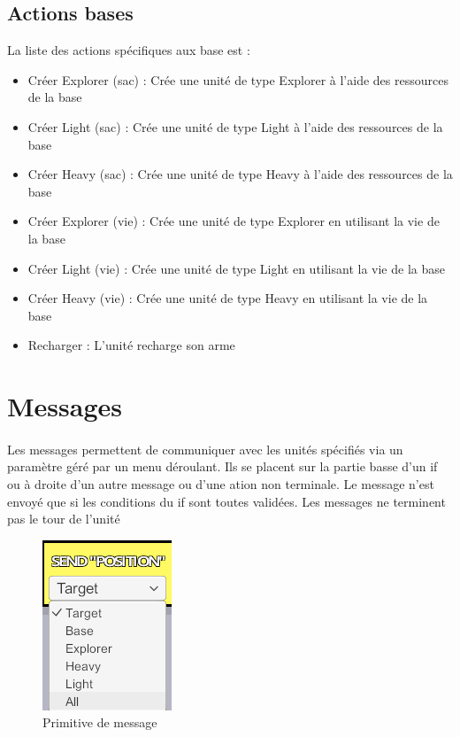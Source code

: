 \documentclass{report}
\begin{document}
\subsection{Actions bases}
La liste des actions spécifiques aux base est :
\begin{itemize}
\item Créer Explorer (sac) : Crée une unité de type Explorer à l'aide des ressources de la base
\item Créer Light (sac) : Crée une unité de type Light à l'aide des ressources de la base
\item Créer Heavy (sac) : Crée une unité de type Heavy à l'aide des ressources de la base
\item Créer Explorer (vie) : Crée une unité de type Explorer en utilisant la vie de la base
\item Créer Light (vie) : Crée une unité de type Light en utilisant la vie de la base
\item Créer Heavy (vie) : Crée une unité de type Heavy en utilisant la vie de la base
\item Recharger : L'unité recharge son arme
\end{itemize}
\newpage
\section{Messages}
\paragraph{}
Les messages permettent de communiquer avec les unités spécifiés via un paramètre géré par un menu déroulant. Ils se placent sur la partie basse d'un if ou à droite d'un autre message ou d'une ation non terminale. Le message n'est envoyé que si les conditions du if sont toutes validées. Les messages ne terminent pas le tour de l'unité\newline
\begin{figure}[!h]
	\centering
		\includegraphics[scale=1]{msg.png}
	\caption{Primitive de message}
\end{figure}
\end{document}
